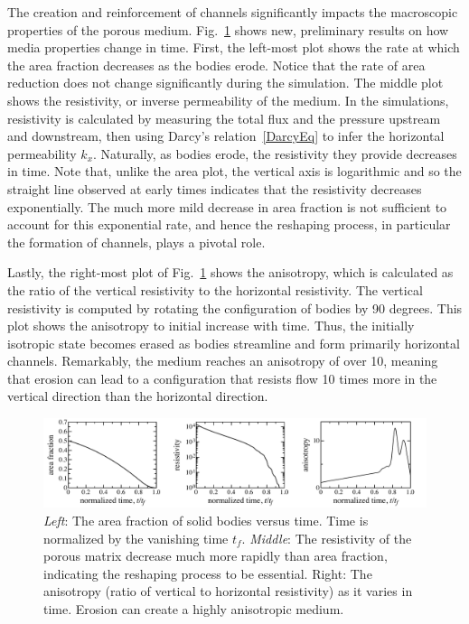 \documentclass[11pt]{article}
\begin{document}
The creation and reinforcement of channels significantly impacts the macroscopic properties of the porous medium. Fig.~\ref{fig3} shows new, preliminary results on how media properties change in time. First, the left-most plot shows the rate at which the area fraction decreases as the bodies erode. Notice that the rate of area reduction does not change significantly during the simulation. The middle plot shows the resistivity, or inverse permeability of the medium. In the simulations, resistivity is calculated by measuring the total flux and the pressure upstream and downstream, then using Darcy's relation~\eqref{DarcyEq} to infer the horizontal permeability $k_x$. Naturally, as bodies erode, the resistivity they provide decreases in time. Note that, unlike the area plot, the vertical axis is logarithmic and so the straight line observed at early times indicates that the resistivity decreases exponentially. The much more mild decrease in area fraction is not sufficient to account for this exponential rate, and hence the reshaping process, in particular the formation of channels, plays a pivotal role.  

Lastly, the right-most plot of Fig.~\ref{fig3} shows the anisotropy, which is calculated as the ratio of the vertical resistivity to the horizontal resistivity. The vertical resistivity is computed by rotating the configuration of bodies by 90 degrees. This plot shows the anisotropy to initial increase with time. Thus, the initially isotropic state becomes erased as bodies streamline and form primarily horizontal channels. Remarkably, the medium reaches an anisotropy of over 10, meaning that erosion can lead to a configuration that resists flow 10 times more in the vertical direction than the horizontal direction.

\begin{figure}[htp]
\begin{center}
\includegraphics[width = 0.99 \textwidth]{./figs/fig3.pdf}
  \caption{\label{fig3} {\em Left}: The area fraction of solid bodies versus time. Time is normalized by the vanishing time $t_f$. {\em Middle}: The resistivity of the porous matrix decrease much more rapidly than area fraction, indicating the reshaping process to be essential. Right: The anisotropy (ratio of vertical to horizontal resistivity) as it varies in time. Erosion can create a highly anisotropic medium.}
\end{center}
\end{figure}
\end{document}
